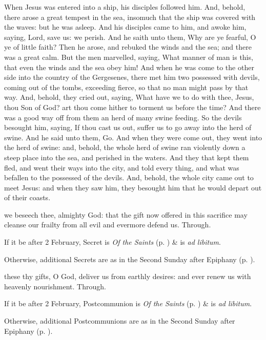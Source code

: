  When Jesus was entered into a ship, his disciples followed him. And, behold, there arose a great tempest in the sea, insomuch that the ship was covered with the waves: but he was asleep. And his disciples came to him, and awoke him, saying, Lord, save us: we perish. And he saith unto them, Why are ye fearful, O ye of little faith? Then he arose, and rebuked the winds and the sea; and there was a great calm. But the men marvelled, saying, What manner of man is this, that even the winds and the sea obey him! And when he was come to the other side into the country of the Gergesenes, there met him two possessed with devils, coming out of the tombs, exceeding fierce, so that no man might pass by that way. And, behold, they cried out, saying, What have we to do with thee, Jesus, thou Son of God? art thou come hither to torment us before the time? And there was a good way off from them an herd of many swine feeding. So the devils besought him, saying, If thou cast us out, suffer us to go away into the herd of swine. And he said unto them, Go. And when they were come out, they went into the herd of swine: and, behold, the whole herd of swine ran violently down a steep place into the sea, and perished in the waters. And they that kept them fled, and went their ways into the city, and told every thing, and what was befallen to the possessed of the devils. And, behold, the whole city came out to meet Jesus: and when they saw him, they besought him that he would depart out of their coasts.


\secret
{} we beseech thee, almighty God: that the gift now offered in this sacrifice may cleanse our frailty from all evil and evermore defend us. Through.
\begin{rubric}
    If it be after 2 February,  Secret is \emph{Of the Saints} (p. \pageref{SPSaints}) \&  is \emph{ad libitum}.\par
    Otherwise, additional Secrets are as in the Second Sunday after Epiphany (p. \pageref{EpiphanyIISecret}).
\end{rubric}
\postcommunion
{} these thy gifts, O God, deliver us from earthly desires: and ever renew us with heavenly nourishment. Through.
\begin{rubric}
    If it be after 2 February,  Postcommunion is \emph{Of the Saints} (p. \pageref{SPSaints}) \&  is \emph{ad libitum}.\par
    Otherwise, additional Postcommunions are as in the Second Sunday after Epiphany (p. \pageref{EpiphanyIIPostcommunion}).
\end{rubric}


